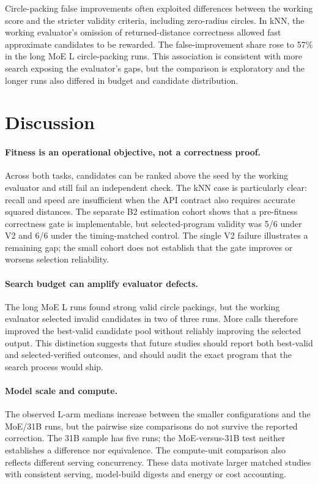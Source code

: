 \documentclass[11pt]{article}
\begin{document}
Circle-packing false improvements often exploited differences between the working score and the stricter validity criteria, including zero-radius circles. In kNN, the working evaluator's omission of returned-distance correctness allowed fast approximate candidates to be rewarded. The false-improvement share rose to 57\% in the long MoE L circle-packing runs. This association is consistent with more search exposing the evaluator's gaps, but the comparison is exploratory and the longer runs also differed in budget and candidate distribution.

\section{Discussion}\label{sec:discussion}

\paragraph{Fitness is an operational objective, not a correctness proof.} Across both tasks, candidates can be ranked above the seed by the working evaluator and still fail an independent check. The kNN case is particularly clear: recall and speed are insufficient when the API contract also requires accurate squared distances. The separate B2 estimation cohort shows that a pre-fitness correctness gate is implementable, but selected-program validity was 5/6 under V2 and 6/6 under the timing-matched control. The single V2 failure illustrates a remaining gap; the small cohort does not establish that the gate improves or worsens selection reliability.

\paragraph{Search budget can amplify evaluator defects.} The long MoE L runs found strong valid circle packings, but the working evaluator selected invalid candidates in two of three runs. More calls therefore improved the best-valid candidate pool without reliably improving the selected output. This distinction suggests that future studies should report both best-valid and selected-verified outcomes, and should audit the exact program that the search process would ship.

\paragraph{Model scale and compute.} The observed L-arm medians increase between the smaller configurations and the MoE/31B runs, but the pairwise size comparisons do not survive the reported correction. The 31B sample has five runs; the MoE-versus-31B test neither establishes a difference nor equivalence. The compute-unit comparison also reflects different serving concurrency. These data motivate larger matched studies with consistent serving, model-build digests and energy or cost accounting.
\end{document}
